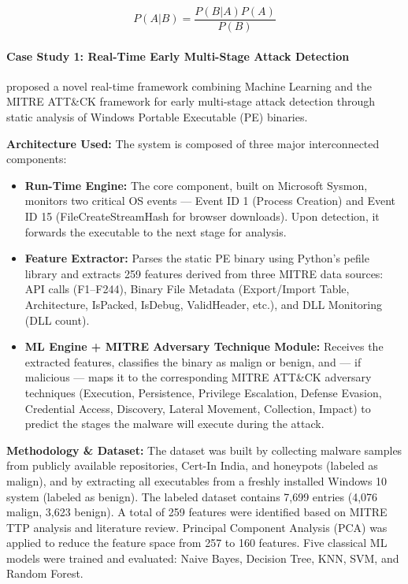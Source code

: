 \begin{equation}
    P(A|B) = \frac{P(B|A) P(A)}{P(B)}
    \label{eq:bayes}
\end{equation}

\paragraph{Case Study 1: Real-Time Early Multi-Stage Attack Detection \protect\cite{takey2021real}}
\cite{takey2021real} proposed a novel real-time framework combining Machine Learning and the MITRE ATT\&CK framework for early multi-stage attack detection through static analysis of Windows Portable Executable (PE) binaries.

\textbf{Architecture Used:} The system is composed of three major interconnected components:
\begin{itemize}
    \item \textbf{Run-Time Engine:} The core component, built on Microsoft Sysmon, monitors two critical OS events --- Event ID 1 (Process Creation) and Event ID 15 (FileCreateStreamHash for browser downloads). Upon detection, it forwards the executable to the next stage for analysis.
    \item \textbf{Feature Extractor:} Parses the static PE binary using Python's pefile library and extracts 259 features derived from three MITRE data sources: API calls (F1--F244), Binary File Metadata (Export/Import Table, Architecture, IsPacked, IsDebug, ValidHeader, etc.), and DLL Monitoring (DLL count).
    \item \textbf{ML Engine + MITRE Adversary Technique Module:} Receives the extracted features, classifies the binary as malign or benign, and --- if malicious --- maps it to the corresponding MITRE ATT\&CK adversary techniques (Execution, Persistence, Privilege Escalation, Defense Evasion, Credential Access, Discovery, Lateral Movement, Collection, Impact) to predict the stages the malware will execute during the attack.
\end{itemize}

\textbf{Methodology \& Dataset:} The dataset was built by collecting malware samples from publicly available repositories, Cert-In India, and honeypots (labeled as malign), and by extracting all executables from a freshly installed Windows 10 system (labeled as benign). The labeled dataset contains 7,699 entries (4,076 malign, 3,623 benign). A total of 259 features were identified based on MITRE TTP analysis and literature review. Principal Component Analysis (PCA) was applied to reduce the feature space from 257 to 160 features. Five classical ML models were trained and evaluated: Naive Bayes, Decision Tree, KNN, SVM, and Random Forest.

